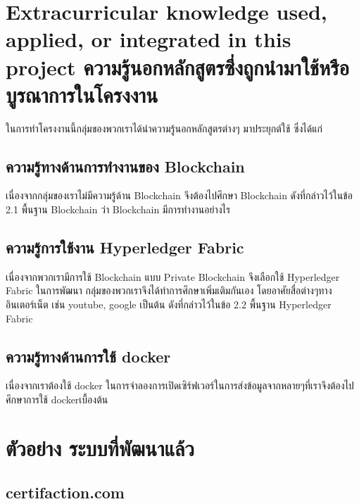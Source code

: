 
\section{\ifenglish%
Extracurricular knowledge used, applied, or integrated in this project
\else%
ความรู้นอกหลักสูตรซึ่งถูกนำมาใช้หรือบูรณาการในโครงงาน
\fi
}
\enskip \enskip \enskip \enskip \enskip ในการทำโครงงานนี้กลุ่มของพวกเราได้นำความรู้นอกหลักสูตรต่างๆ มาประยุกต์ใช้ ซึ่งได้แก่

\subsection{ความรู้ทางด้านการทำงานของ Blockchain}
\enskip \enskip \enskip เนื่องจากกลุ่มของเราไม่มีความรู้ด้าน Blockchain จึงต้องไปศึกษา Blockchain ดังที่กล่าวไว้ในข้อ 2.1 พื้นฐาน Blockchain ว่า Blockchain มีการทำงานอย่างไร

\subsection{ความรู้การใช้งาน Hyperledger Fabric}
\enskip \enskip \enskip เนื่องจากพวกเรามีการใช้ Blockchain แบบ Private Blockchain จึงเลือกใช้ Hyperledger Fabric  ในการพัฒนา กลุ่มของพวกเราจึงได้ทำการศึกษาเพิ่มเติมกันเอง
โดยอาศัยสื่อต่างๆทางอินเตอร์เน็ต เช่น youtube, google เป็นต้น ดังที่กล่าวไว้ในข้อ 2.2 พื้นฐาน Hyperledger Fabric


\subsection{ความรู้ทางด้านการใช้ docker}
\enskip \enskip \enskip เนื่องจากเราต้องใช้ docker ในการจำลองการเปิดเซิร์ฟเวอร์ในการส่งข้อมูลจากหลายๆที่เราจึงต้องไปศึกษาการใช้ dockerเบื้องต้น

\section{ตัวอย่าง ระบบที่พัฒนาแล้ว}
\enskip \enskip \enskip \enskip \enskip

\subsection{certifaction.com~\cite{certifaction}}

